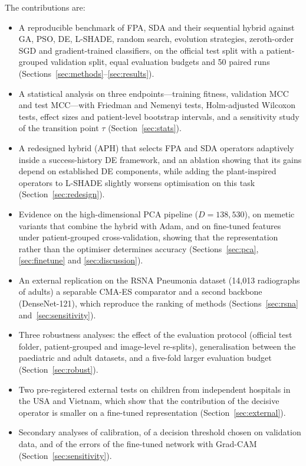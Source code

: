 \documentclass[10pt,letterpaper]{article}
\begin{document}
The contributions are:
\begin{itemize}
\item A reproducible benchmark of FPA, SDA and their sequential hybrid against GA, PSO, DE, L-SHADE, random search, evolution strategies, zeroth-order SGD and gradient-trained classifiers, on the official test split with a patient-grouped validation split, equal evaluation budgets and 50 paired runs (Sections~\ref{sec:methods}--\ref{sec:results}).
\item A statistical analysis on three endpoints---training fitness, validation MCC and test MCC---with Friedman and Nemenyi tests, Holm-adjusted Wilcoxon tests, effect sizes and patient-level bootstrap intervals, and a sensitivity study of the transition point $\tau$ (Section~\ref{sec:stats}).
\item A redesigned hybrid (APH) that selects FPA and SDA operators adaptively inside a success-history DE framework, and an ablation showing that its gains depend on established DE components, while adding the plant-inspired operators to L-SHADE slightly worsens optimisation on this task (Section~\ref{sec:redesign}).
\item Evidence on the high-dimensional PCA pipeline ($D=138{,}530$), on memetic variants that combine the hybrid with Adam, and on fine-tuned features under patient-grouped cross-validation, showing that the representation rather than the optimiser determines accuracy (Sections~\ref{sec:pca}, \ref{sec:finetune} and \ref{sec:discussion}).
\item An external replication on the RSNA Pneumonia dataset (14,013 radiographs of adults) a separable CMA-ES comparator and a second backbone (DenseNet-121), which reproduce the ranking of methods (Sections~\ref{sec:rsna} and~\ref{sec:sensitivity}).
\item Three robustness analyses: the effect of the evaluation protocol (official test folder, patient-grouped and image-level re-splits), generalisation between the paediatric and adult datasets, and a five-fold larger evaluation budget (Section~\ref{sec:robust}).
\item Two pre-registered external tests on children from independent hospitals in the USA and Vietnam, which show that the contribution of the decisive operator is smaller on a fine-tuned representation (Section~\ref{sec:external}).
\item Secondary analyses of calibration, of a decision threshold chosen on validation data, and of the errors of the fine-tuned network with Grad-CAM (Section~\ref{sec:sensitivity}).
\end{itemize}
\end{document}
